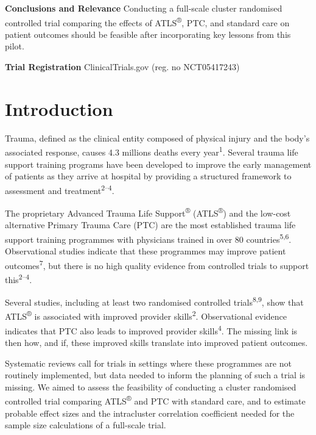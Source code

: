 \documentclass[
]{article}
\begin{document}
\textbf{Conclusions and Relevance} Conducting a full-scale cluster randomised controlled trial comparing the effects of ATLS\textsuperscript{®}, PTC, and standard care on patient outcomes should be feasible after incorporating key lessons from this pilot.

\textbf{Trial Registration} ClinicalTrials.gov (reg. no NCT05417243)

\newpage

\newpage

\hypertarget{introduction}{%
\section{Introduction}\label{introduction}}

Trauma, defined as the clinical entity composed of physical injury and the body's associated response, causes 4.3 millions deaths every year\textsuperscript{1}. Several trauma life support training programs have been developed to improve the early management of patients as they arrive at hospital by providing a structured framework to assessment and treatment\textsuperscript{2--4}.

The proprietary Advanced Trauma Life Support\textsuperscript{®} (ATLS\textsuperscript{®}) and the low-cost alternative Primary Trauma Care (PTC) are the most established trauma life support training programmes with physicians trained in over 80 countries\textsuperscript{5,6}. Observational studies indicate that these programmes may improve patient outcomes\textsuperscript{7}, but there is no high quality evidence from controlled trials to support this\textsuperscript{2--4}.

Several studies, including at least two randomised controlled trials\textsuperscript{8,9}, show that ATLS\textsuperscript{®} is associated with improved provider skills\textsuperscript{2}. Observational evidence indicates that PTC also leads to improved provider skills\textsuperscript{4}. The missing link is then how, and if, these improved skills translate into improved patient outcomes.

Systematic reviews call for trials in settings where these programmes are not routinely implemented, but data needed to inform the planning of such a trial is missing. We aimed to assess the feasibility of conducting a cluster randomised controlled trial comparing ATLS\textsuperscript{®} and PTC with standard care, and to estimate probable effect sizes and the intracluster correlation coefficient needed for the sample size calculations of a full-scale trial.
\end{document}
